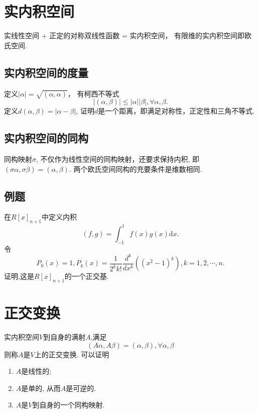 \section{实内积空间}
实线性空间 + 正定的对称双线性函数 = 实内积空间，
有限维的实内积空间即欧氏空间.

\subsection{实内积空间的度量}
定义$|\alpha| = \sqrt{(\alpha, \alpha)}$，
有柯西不等式
$$|(\alpha,\beta)| \le |\alpha| |\beta|, \forall \alpha, \beta.$$
定义$d(\alpha, \beta) = |\alpha - \beta|$,
证明$d$是一个距离，即满足对称性，正定性和三角不等式.


\subsection{实内积空间的同构}
同构映射$\sigma$, 不仅作为线性空间的同构映射，还要求保持内积, 即
$(\sigma \alpha, \sigma \beta) = (\alpha, \beta)$.
两个欧氏空间同构的充要条件是维数相同.

\subsection{例题}
在$R[x]_{n+1}$中定义内积
$$(f,g) = \int^{1}_{-1}f(x)g(x) \mathrm{d}x.$$
令
$$P_0(x) = 1, P_k(x) = \frac{1}{2^k k!} \frac{d^k}{dx^k} ((x^2-1)^k), k = 1,2,\cdots,n.$$
证明,这是$R[x]_{n+1}$的一个正交基.
\vspace{3cm}


\section{正交变换}
实内积空间$V$到自身的满射$A$,满足
$$(A\alpha, A\beta) = (\alpha, \beta), \forall \alpha, \beta$$
则称$A$是$V$上的正交变换.
可以证明
\begin{enumerate}
\item $A$是线性的;
\item $A$是单的, 从而$A$是可逆的.
\item $A$是$V$到自身的一个同构映射.
\end{enumerate}


